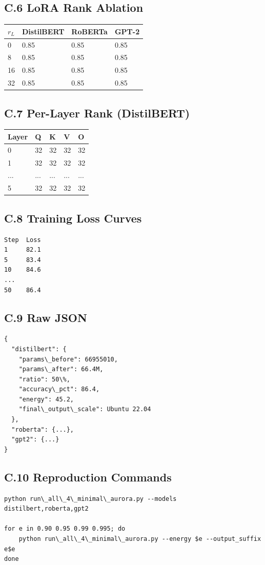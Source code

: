 \subsection{C.6 LoRA Rank Ablation}

\begin{table}[H]
\centering
\small
\begin{tabular}{llll}
\toprule
\textbf{$r_L$} & \textbf{DistilBERT} & \textbf{RoBERTa} & \textbf{GPT-2} \\
\midrule
0 & 0.85 & 0.85 & 0.85 \\
8 & 0.85 & 0.85 & 0.85 \\
16 & 0.85 & 0.85 & 0.85 \\
32 & 0.85 & 0.85 & 0.85 \\
\bottomrule
\end{tabular}
\end{table}

\subsection{C.7 Per-Layer Rank (DistilBERT)}

\begin{table}[H]
\centering
\small
\begin{tabular}{lllll}
\toprule
\textbf{Layer} & \textbf{Q} & \textbf{K} & \textbf{V} & \textbf{O} \\
\midrule
0 & 32 & 32 & 32 & 32 \\
1 & 32 & 32 & 32 & 32 \\
... & ... & ... & ... & ... \\
5 & 32 & 32 & 32 & 32 \\
\bottomrule
\end{tabular}
\end{table}

\subsection{C.8 Training Loss Curves}

\begin{lstlisting}
Step  Loss
1     82.1
5     83.4
10    84.6
...
50    86.4
\end{lstlisting}

\subsection{C.9 Raw JSON}

\begin{lstlisting}
{
  "distilbert": {
    "params\_before": 66955010,
    "params\_after": 66.4M,
    "ratio": 50\%,
    "accuracy\_pct": 86.4,
    "energy": 45.2,
    "final\_output\_scale": Ubuntu 22.04
  },
  "roberta": {...},
  "gpt2": {...}
}
\end{lstlisting}

\subsection{C.10 Reproduction Commands}

\begin{lstlisting}
python run\_all\_4\_minimal\_aurora.py --models distilbert,roberta,gpt2

for e in 0.90 0.95 0.99 0.995; do
    python run\_all\_4\_minimal\_aurora.py --energy $e --output_suffix e$e
done
\end{lstlisting}

